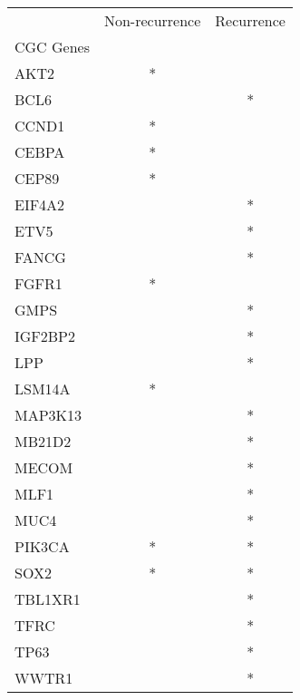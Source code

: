 \begin{tabular}{lcc}
\toprule
{} & Non-recurrence & Recurrence \\
CGC Genes &                &            \\
\midrule
AKT2      &              * &            \\
BCL6      &                &          * \\
CCND1     &              * &            \\
CEBPA     &              * &            \\
CEP89     &              * &            \\
EIF4A2    &                &          * \\
ETV5      &                &          * \\
FANCG     &                &          * \\
FGFR1     &              * &            \\
GMPS      &                &          * \\
IGF2BP2   &                &          * \\
LPP       &                &          * \\
LSM14A    &              * &            \\
MAP3K13   &                &          * \\
MB21D2    &                &          * \\
MECOM     &                &          * \\
MLF1      &                &          * \\
MUC4      &                &          * \\
PIK3CA    &              * &          * \\
SOX2      &              * &          * \\
TBL1XR1   &                &          * \\
TFRC      &                &          * \\
TP63      &                &          * \\
WWTR1     &                &          * \\
\bottomrule
\end{tabular}
